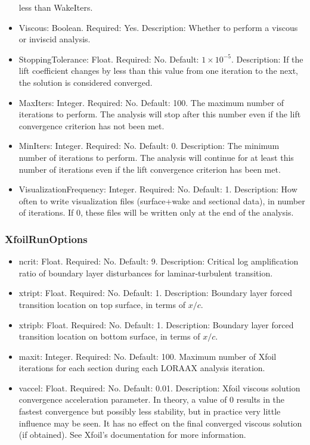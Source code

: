 \documentclass[11pt]{article}
\begin{document}
\begin{itemize}
		less than WakeIters.
	\item Viscous: Boolean. Required: Yes. Description: Whether to perform a
		viscous or inviscid analysis.
	\item StoppingTolerance: Float. Required: No. Default: $1\times 10^{-5}$.
		Description: If the lift coefficient changes by less than this value
		from one iteration to the next, the solution is considered converged.
	\item MaxIters: Integer. Required: No. Default: 100. The maximum number of
		iterations to perform. The analysis will stop after this number even
		if the lift convergence criterion has not been met.
	\item MinIters: Integer. Required: No. Default: 0. Description: The minimum number of
		iterations to perform. The analysis will continue for at least this
		number of iterations even if the lift convergence criterion has been
		met.
	\item VisualizationFrequency: Integer. Required: No. Default: 1.
		Description: How often to write visualization files (surface+wake and
		sectional data), in number of iterations. If 0, these files will be
		written only at the end of the analysis.
\end{itemize}

\subsubsection{XfoilRunOptions}

\begin{itemize}
	\item ncrit: Float. Required: No. Default: 9. Description: Critical
		log amplification ratio of boundary layer disturbances for
		laminar-turbulent transition.
	\item xtript: Float. Required: No. Default: 1. Description: Boundary layer
		forced transition location on top surface, in terms of $x/c$.
	\item xtripb: Float. Required: No. Default: 1. Description: Boundary layer
		forced transition location on bottom surface, in terms of $x/c$.
	\item maxit: Integer. Required: No. Default: 100. Maximum number of Xfoil
		iterations for each section during each LORAAX analysis iteration.
	\item vaccel: Float. Required: No. Default: 0.01. Description: Xfoil
		viscous solution convergence acceleration parameter. In theory, a value of 0 results
		in the fastest convergence but possibly less stability, but in practice
		very little influence may be seen. It has no effect on the final
		converged viscous solution (if obtained). See Xfoil's documentation for
		more information.
\end{itemize}
\end{document}

